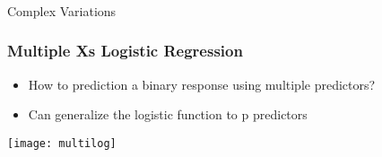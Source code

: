 




\begin{frame}[fragile]\frametitle{}
\begin{center}
{\Large Complex Variations}
\end{center}
\end{frame}



\begin{frame}[fragile]\frametitle{Multiple Xs Logistic Regression}
\begin{itemize}
\item How to prediction a binary response using multiple predictors?
\item Can generalize the logistic function to p predictors
\end{itemize}
\begin{center}
\texttt{[image: multilog]}
\end{center}
\end{frame}

